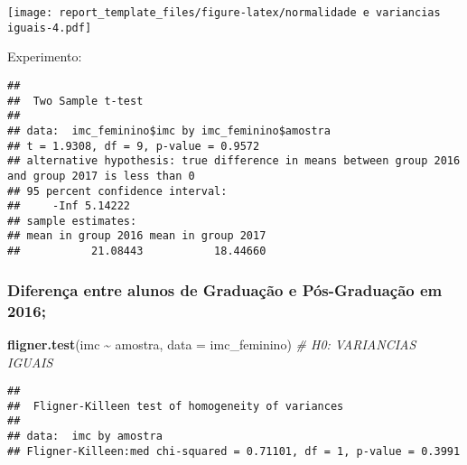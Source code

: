 \documentclass[
]{article}
\newenvironment{Shaded}{\begin{snugshade}}{\end{snugshade}}
\newcommand{\AttributeTok}[1]{\textcolor[rgb]{0.13,0.29,0.53}{#1}}
\newcommand{\CommentTok}[1]{\textcolor[rgb]{0.56,0.35,0.01}{\textit{#1}}}
\newcommand{\ConstantTok}[1]{\textcolor[rgb]{0.56,0.35,0.01}{#1}}
\newcommand{\DecValTok}[1]{\textcolor[rgb]{0.00,0.00,0.81}{#1}}
\newcommand{\FloatTok}[1]{\textcolor[rgb]{0.00,0.00,0.81}{#1}}
\newcommand{\FunctionTok}[1]{\textcolor[rgb]{0.13,0.29,0.53}{\textbf{#1}}}
\newcommand{\NormalTok}[1]{#1}
\newcommand{\SpecialCharTok}[1]{\textcolor[rgb]{0.81,0.36,0.00}{\textbf{#1}}}
\newcommand{\StringTok}[1]{\textcolor[rgb]{0.31,0.60,0.02}{#1}}
\begin{document}
\texttt{[image: report\_template\_files/figure-latex/normalidade e variancias iguais-4.pdf]}

Experimento:

\begin{Shaded}
\end{Shaded}

\begin{verbatim}
## 
##  Two Sample t-test
## 
## data:  imc_feminino$imc by imc_feminino$amostra
## t = 1.9308, df = 9, p-value = 0.9572
## alternative hypothesis: true difference in means between group 2016 and group 2017 is less than 0
## 95 percent confidence interval:
##     -Inf 5.14222
## sample estimates:
## mean in group 2016 mean in group 2017 
##           21.08443           18.44660
\end{verbatim}

\subsubsection{Diferença entre alunos de Graduação e Pós-Graduação em
2016;}\label{diferenuxe7a-entre-alunos-de-graduauxe7uxe3o-e-puxf3s-graduauxe7uxe3o-em-2016-1}

\begin{Shaded}
\begin{Highlighting}[]
\FunctionTok{fligner.test}\NormalTok{(imc }\SpecialCharTok{\textasciitilde{}}\NormalTok{ amostra, }\AttributeTok{data =}\NormalTok{ imc\_feminino) }\CommentTok{\# H0: VARIANCIAS IGUAIS}
\end{Highlighting}
\end{Shaded}

\begin{verbatim}
## 
##  Fligner-Killeen test of homogeneity of variances
## 
## data:  imc by amostra
## Fligner-Killeen:med chi-squared = 0.71101, df = 1, p-value = 0.3991
\end{verbatim}

\begin{Shaded}
\end{Shaded}
\end{document}

